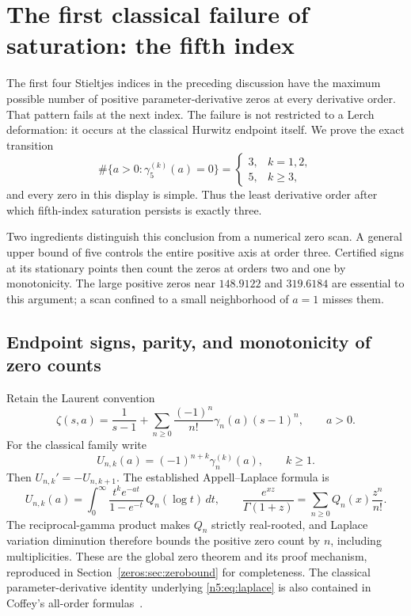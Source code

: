 
\section{The first classical failure of saturation: the fifth index}
\label{n5:sec:transition}\label{sec:classical-zeros}

The first four Stieltjes indices in the preceding discussion have the maximum possible
number of positive parameter-derivative zeros at every derivative order.
That pattern fails at the next index.  The failure is not restricted to a
Lerch deformation: it occurs at the classical Hurwitz endpoint itself.
We prove the exact transition
\begin{equation}\label{n5:eq:count-sequence}
 \#\{a>0:\gamma_5^{(k)}(a)=0\}=
 \begin{cases}3,&k=1,2,\\5,&k\geq3,\end{cases}
\end{equation}
and every zero in this display is simple.  Thus the least derivative order
after which fifth-index saturation persists is exactly three.

Two ingredients distinguish this conclusion from a numerical zero scan.
A general upper bound of five controls the entire positive axis at order
three.  Certified signs at its stationary points then count the zeros at
orders two and one by monotonicity.  The large positive zeros near
$148.9122$ and $319.6184$ are essential to this argument; a scan confined to
a small neighborhood of $a=1$ misses them.

\subsection{Endpoint signs, parity, and monotonicity of zero counts}

Retain the Laurent convention
\[
 \zeta(s,a)=\frac1{s-1}+
       \sum_{n\geq0}\frac{(-1)^n}{n!}\gamma_n(a)(s-1)^n,
 \qquad a>0.
\]
For the classical family write
\[
 U_{n,k}(a)=(-1)^{n+k}\gamma_n^{(k)}(a),\qquad k\geq1.
\]
Then $U_{n,k}'=-U_{n,k+1}$.  The established Appell--Laplace formula is
\begin{equation}\label{n5:eq:laplace}
 U_{n,k}(a)=\int_0^\infty
 \frac{t^k e^{-at}}{1-e^{-t}}\,Q_n(\log t)\,dt,
 \qquad
 \frac{e^{xz}}{\Gamma(1+z)}=
       \sum_{n\geq0}Q_n(x)\frac{z^n}{n!}.
\end{equation}
The reciprocal-gamma product makes $Q_n$ strictly real-rooted, and Laplace
variation diminution therefore bounds the positive zero count by $n$,
including multiplicities.  These are the global zero theorem
and its proof mechanism, reproduced in Section~\ref{zeros:sec:zerobound}
for completeness.  The classical parameter-derivative identity underlying
\eqref{n5:eq:laplace} is also contained in Coffey's all-order
formulas~\cite{stieltjes:Coffey}.

